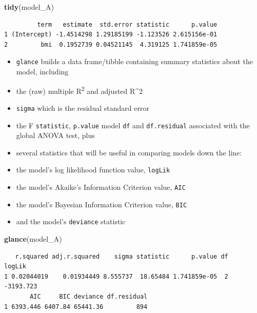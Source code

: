 \documentclass[]{book}
\newenvironment{Shaded}{\begin{snugshade}}{\end{snugshade}}
\newcommand{\KeywordTok}[1]{\textcolor[rgb]{0.13,0.29,0.53}{\textbf{#1}}}
\newcommand{\NormalTok}[1]{#1}
\providecommand{\tightlist}{%
  \setlength{\itemsep}{0pt}\setlength{\parskip}{0pt}}
\theoremstyle{definition}
\theoremstyle{definition}
\theoremstyle{definition}
\theoremstyle{remark}
\begin{document}
\begin{Shaded}
\begin{Highlighting}[]
\KeywordTok{tidy}\NormalTok{(model_A)}
\end{Highlighting}
\end{Shaded}

\begin{verbatim}
         term   estimate  std.error statistic      p.value
1 (Intercept) -1.4514298 1.29185199 -1.123526 2.615156e-01
2         bmi  0.1952739 0.04521145  4.319125 1.741859e-05
\end{verbatim}

\begin{itemize}
\tightlist
\item
  \texttt{glance} builds a data frame/tibble containing summary
  statistics about the model, including
\item
  the (raw) multiple R\textsuperscript{2} and adjusted R\^{}2
\item
  \texttt{sigma} which is the residual standard error
\item
  the F \texttt{statistic}, \texttt{p.value} model \texttt{df} and
  \texttt{df.residual} associated with the global ANOVA test, plus
\item
  several statistics that will be useful in comparing models down the
  line:
\item
  the model's log likelihood function value, \texttt{logLik}
\item
  the model's Akaike's Information Criterion value, \texttt{AIC}
\item
  the model's Bayesian Information Criterion value, \texttt{BIC}
\item
  and the model's \texttt{deviance} statistic
\end{itemize}

\begin{Shaded}
\begin{Highlighting}[]
\KeywordTok{glance}\NormalTok{(model_A)}
\end{Highlighting}
\end{Shaded}

\begin{verbatim}
   r.squared adj.r.squared    sigma statistic      p.value df    logLik
1 0.02044019    0.01934449 8.555737  18.65484 1.741859e-05  2 -3193.723
       AIC     BIC deviance df.residual
1 6393.446 6407.84 65441.36         894
\end{verbatim}
\end{document}
